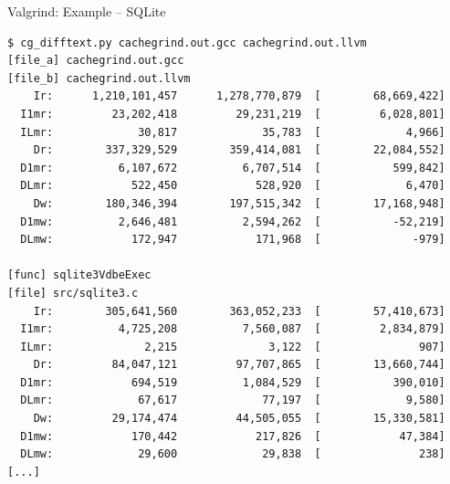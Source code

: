 \documentclass{beamer}
\begin{document}
\begin{frame}[fragile]{Valgrind: Example -- SQLite}
  \begin{lrbox}{\myv}
    \begin{minipage}{\textwidth}
\begin{verbatim}
$ cg_difftext.py cachegrind.out.gcc cachegrind.out.llvm
[file_a] cachegrind.out.gcc
[file_b] cachegrind.out.llvm
    Ir:      1,210,101,457      1,278,770,879  [        68,669,422]
  I1mr:         23,202,418         29,231,219  [         6,028,801]
  ILmr:             30,817             35,783  [             4,966]
    Dr:        337,329,529        359,414,081  [        22,084,552]
  D1mr:          6,107,672          6,707,514  [           599,842]
  DLmr:            522,450            528,920  [             6,470]
    Dw:        180,346,394        197,515,342  [        17,168,948]
  D1mw:          2,646,481          2,594,262  [           -52,219]
  DLmw:            172,947            171,968  [              -979]

[func] sqlite3VdbeExec
[file] src/sqlite3.c
    Ir:        305,641,560        363,052,233  [        57,410,673]
  I1mr:          4,725,208          7,560,087  [         2,834,879]
  ILmr:              2,215              3,122  [               907]
    Dr:         84,047,121         97,707,865  [        13,660,744]
  D1mr:            694,519          1,084,529  [           390,010]
  DLmr:             67,617             77,197  [             9,580]
    Dw:         29,174,474         44,505,055  [        15,330,581]
  D1mw:            170,442            217,826  [            47,384]
  DLmw:             29,600             29,838  [               238]
[...]
\end{verbatim}
    \end{minipage}
  \end{lrbox}
  \resizebox{0.5\textwidth}{!}{\usebox\myv}
\end{frame}

\end{document}

